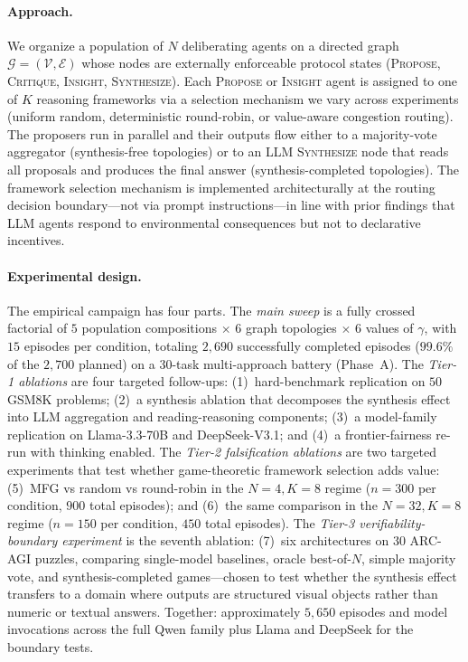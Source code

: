 \documentclass[11pt]{amsart}
\newcommand{\g}{\gamma}
\newcommand\1{{\mathds{1}}}
\newcommand\V{{\mathcal{V}}}
\newcommand\G{{\mathcal{G}}}
\theoremstyle{definition}
\theoremstyle{remark}
\numberwithin{equation}{section}
\begin{document}
\paragraph{Approach.}
We organize a population of $N$ deliberating agents on a directed graph $\G = (\V, \mathcal{E})$ whose nodes are externally enforceable protocol states (\textsc{Propose}, \textsc{Critique}, \textsc{Insight}, \textsc{Synthesize}).
Each \textsc{Propose} or \textsc{Insight} agent is assigned to one of $K$ reasoning frameworks via a selection mechanism we vary across experiments (uniform random, deterministic round-robin, or value-aware congestion routing).
The proposers run in parallel and their outputs flow either to a majority-vote aggregator (synthesis-free topologies) or to an LLM \textsc{Synthesize} node that reads all proposals and produces the final answer (synthesis-completed topologies).
The framework selection mechanism is implemented architecturally at the routing decision boundary---not via prompt instructions---in line with prior findings that LLM agents respond to environmental consequences but not to declarative incentives.

\paragraph{Experimental design.}
The empirical campaign has four parts.
The \emph{main sweep} is a fully crossed factorial of $5$ population compositions $\times$ $6$ graph topologies $\times$ $6$ values of $\g$, with $15$ episodes per condition, totaling $2{,}690$ successfully completed episodes ($99.6\%$ of the $2{,}700$ planned) on a $30$-task multi-approach battery (Phase~A).
The \emph{Tier-1 ablations} are four targeted follow-ups: (1)~hard-benchmark replication on $50$ GSM8K problems; (2)~a synthesis ablation that decomposes the synthesis effect into LLM aggregation and reading-reasoning components; (3)~a model-family replication on Llama-3.3-70B and DeepSeek-V3.1; and (4)~a frontier-fairness re-run with thinking enabled.
The \emph{Tier-2 falsification ablations} are two targeted experiments that test whether game-theoretic framework selection adds value: (5)~MFG vs random vs round-robin in the $N\!=\!4, K\!=\!8$ regime ($n\!=\!300$ per condition, $900$ total episodes); and (6)~the same comparison in the $N\!=\!32, K\!=\!8$ regime ($n\!=\!150$ per condition, $450$ total episodes).
The \emph{Tier-3 verifiability-boundary experiment} is the seventh ablation: (7)~six architectures on $30$ ARC-AGI puzzles, comparing single-model baselines, oracle best-of-$N$, simple majority vote, and synthesis-completed games---chosen to test whether the synthesis effect transfers to a domain where outputs are structured visual objects rather than numeric or textual answers.
Together: approximately $5{,}650$ episodes and model invocations across the full Qwen family plus Llama and DeepSeek for the boundary tests.
\end{document}
